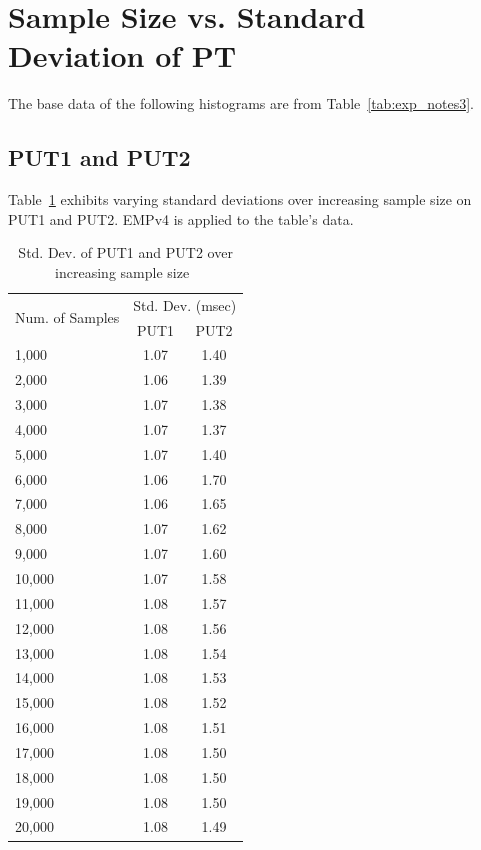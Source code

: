 \documentclass[10pt]{article}
\begin{document}
\clearpage
\newpage

\section{Sample Size vs. Standard Deviation of PT~\label{sec:new_put}}
The base data of the following histograms are from Table~\ref{tab:exp_notes3}.

\subsection{PUT1 and PUT2~\label{sec:put1_put2}}
Table~\ref{fig:put_std} exhibits varying standard deviations 
over increasing sample size on PUT1 and PUT2.
EMPv4 is applied to the table's data.

\begin{table}[h]
\centering
{
 \begin{tabular}{|l|c|c|} \hline
\multirow{2}{*}{Num. of Samples}   & \multicolumn{2}{|c|}{Std. Dev. (msec)} \\  \cline{2-3}
						    & PUT1 & PUT2 \\  \hline\hline
1,000 & 1.07 & 1.40\\ \hline
2,000 & 1.06 & 1.39\\ \hline
3,000 & 1.07 & 1.38\\ \hline
4,000 & 1.07 & 1.37\\ \hline
5,000 & 1.07 & 1.40\\ \hline
6,000 & 1.06& 1.70\\ \hline
7,000 & 1.06& 1.65\\ \hline
8,000 & 1.07&1.62\\ \hline
9,000 & 1.07&1.60\\ \hline
10,000 & 1.07&1.58\\ \hline
11,000 & 1.08&1.57\\ \hline
12,000 & 1.08&1.56\\ \hline
13,000 & 1.08&1.54\\ \hline
14,000 & 1.08&1.53\\ \hline
15,000 & 1.08&1.52\\ \hline
16,000 & 1.08&1.51\\ \hline
17,000 & 1.08&1.50\\ \hline
18,000 & 1.08&1.50\\ \hline
19,000 & 1.08&1.50\\ \hline 
20,000 & 1.08& 1.49\\ \hline 
  \end{tabular}
  }
 \caption{Std. Dev. of PUT1 and PUT2 over increasing sample size~\label{fig:put_std}}
\end{table}
 
\end{document}
